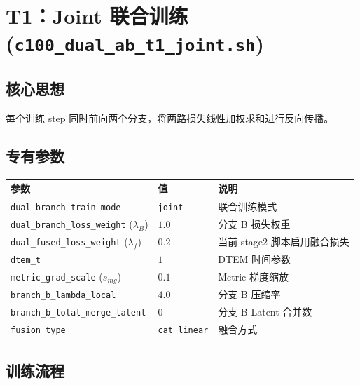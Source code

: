 \documentclass[a4paper,11pt]{article}
\begin{document}
\section{T1：Joint 联合训练 (\texttt{c100\_dual\_ab\_t1\_joint.sh})}

\subsection{核心思想}

每个训练 step 同时前向两个分支，将两路损失线性加权求和进行反向传播。

\subsection{专有参数}

\begin{table}[h]
\centering
\begin{tabular}{l l l}
\toprule
\textbf{参数} & \textbf{值} & \textbf{说明} \\
\midrule
\texttt{dual\_branch\_train\_mode} & \texttt{joint} & 联合训练模式 \\
\texttt{dual\_branch\_loss\_weight} ($\lambda_B$) & $1.0$ & 分支 B 损失权重 \\
\texttt{dual\_fused\_loss\_weight} ($\lambda_f$) & $0.2$ & 当前 stage2 脚本启用融合损失 \\
\texttt{dtem\_t} & $1$ & DTEM 时间参数 \\
\texttt{metric\_grad\_scale} ($s_{mg}$) & $0.1$ & Metric 梯度缩放 \\
\texttt{branch\_b\_lambda\_local} & $4.0$ & 分支 B 压缩率 \\
\texttt{branch\_b\_total\_merge\_latent} & $0$ & 分支 B Latent 合并数 \\
\texttt{fusion\_type} & \texttt{cat\_linear} & 融合方式 \\
\bottomrule
\end{tabular}
\end{table}

\subsection{训练流程}
\end{document}
